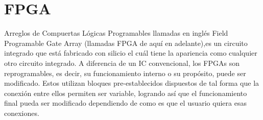 \documentclass[twoside,spanish,ESP,MSc]{plantillaLabUPV}
\theoremstyle{definition}
\newcommand{\fs}{FPGAs }
\begin{document}
%
%
%





\section{FPGA}
Arreglos de Compuertas Lógicas Programables llamadas en inglés Field Programable Gate Array (llamadas FPGA de aquí en adelante),es un circuito integrado que está fabricado con silicio el cuál %
tiene la apariencia como cualquier otro circuito integrado. A diferencia de un IC convencional, los \fs son reprogramables, es decir, su funcionamiento interno o su propósito, puede ser modificado. Estos utilizan bloques pre-establecidos dispuestos de tal forma que la conexión entre ellos permiten ser variable, logrando así que el funcionamiento final pueda ser modificado dependiendo de como es que el usuario quiera esas conexiones.
\end{document}
